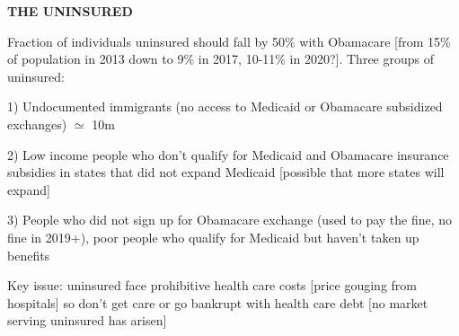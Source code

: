 \documentclass[landscape]{slides}
\begin{document}
\begin{slide}

\end{slide}

\begin{slide}

\end{slide}


\begin{slide}
\begin{center}
{\bf THE UNINSURED}
\end{center}
Fraction of individuals uninsured should fall by 50\% with Obamacare [from 15\% of population in 2013 down to 9\% in 2017, 10-11\% in 2020?]. 
Three groups of uninsured:

\small
1) Undocumented immigrants (no access to Medicaid or Obamacare subsidized exchanges) $\simeq$ 10m

2) Low income people who don't qualify for Medicaid and Obamacare insurance subsidies in states that did not expand Medicaid [possible that more states will expand]

3) People who did not sign up for Obamacare exchange (used to pay the fine, no fine in 2019+), poor people who qualify for Medicaid but haven't taken up benefits
\normalsize

Key issue: uninsured face prohibitive health care costs [price gouging from hospitals] so don't get care or go bankrupt with health care debt
[no market serving uninsured has arisen]

\end{slide}

\begin{slide}

\end{slide}

\begin{slide}

\end{slide}
\end{document}
